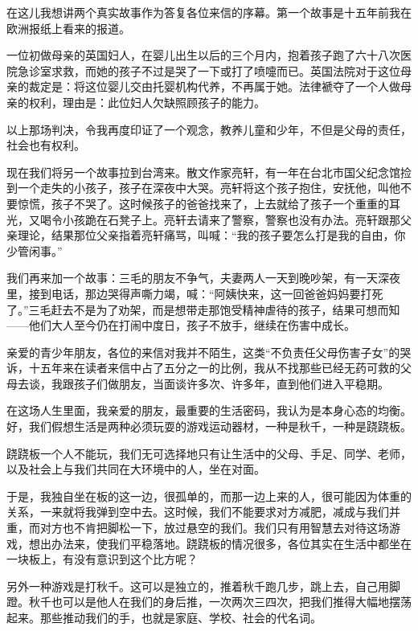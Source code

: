 \par {}
\par 在这儿我想讲两个真实故事作为答复各位来信的序幕。第一个故事是十五年前我在欧洲报纸上看来的报道。
\par 一位初做母亲的英国妇人，在婴儿出生以后的三个月内，抱着孩子跑了六十八次医院急诊室求救，而她的孩子不过是哭了一下或打了喷嚏而已。英国法院对于这位母亲的裁定是：将这位婴儿交由托婴机构代养，不再属于她。法律褫夺了一个人做母亲的权利，理由是：此位妇人欠缺照顾孩子的能力。
\par 以上那场判决，令我再度印证了一个观念，教养儿童和少年，不但是父母的责任，社会也有权利。
\par 现在我们将另一个故事拉到台湾来。散文作家亮轩，有一年在台北市国父纪念馆捡到一个走失的小孩子，孩子在深夜中大哭。亮轩将这个孩子抱住，安抚他，叫他不要惊慌，孩子不哭了。这时候孩子的爸爸找来了，上去就给了孩子一个重重的耳光，又喝令小孩跪在石凳子上。亮轩去请来了警察，警察也没有办法。亮轩跟那父亲理论，结果那位父亲指着亮轩痛骂，叫喊：“我的孩子要怎么打是我的自由，你少管闲事。”
\par 我们再来加一个故事：三毛的朋友不争气，夫妻两人一天到晚吵架，有一天深夜里，接到电话，那边哭得声嘶力竭，喊：“阿姨快来，这一回爸爸妈妈要打死了。”三毛赶去不是为了劝架，而是想带走那饱受精神虐待的孩子，结果可想而知——他们大人至今仍在打闹中度日，孩子不放手，继续在伤害中成长。
\par 亲爱的青少年朋友，各位的来信对我并不陌生，这类“不负责任父母伤害子女”的哭诉，十五年来在读者来信中占了五分之一的比例，我从不找那些已经无药可救的父母去谈，我跟孩子们做朋友，当面谈许多次、许多年，直到他们进入平稳期。
\par 在这场人生里面，我亲爱的朋友，最重要的生活密码，我认为是本身心态的均衡。好，我们假想生活是两种必须玩耍的游戏运动器材，一种是秋千，一种是跷跷板。
\par 跷跷板一个人不能玩，我们无可选择地只有让生活中的父母、手足、同学、老师，以及社会上与我们共同在大环境中的人，坐在对面。
\par 于是，我独自坐在板的这一边，很孤单的，而那一边上来的人，很可能因为体重的关系，一来就将我弹到空中去。这时候，我们不能要求对方减肥，减成与我们并重，而对方也不肯把脚松一下，放过悬空的我们。我们只有用智慧去对待这场游戏，想出办法来，使我们平稳落地。跷跷板的情况很多，各位其实在生活中都坐在一块板上，有没有意识到这个比方呢？
\par 另外一种游戏是打秋千。这可以是独立的，推着秋千跑几步，跳上去，自己用脚蹬。秋千也可以是他人在我们的身后推，一次两次三四次，把我们推得大幅地摆荡起来。那些推动我们的手，也就是家庭、学校、社会的代名词。
